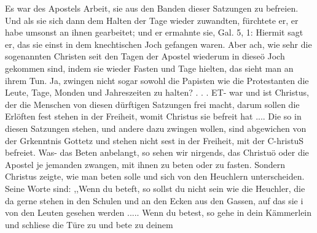 Es war des Apostels Arbeit, sie aus den Banden dieser
Satzungen zu befreien. Und als sie sich dann dem Halten der
Tage wieder zuwandten, fürchtete er, er habe umsonst an ihnen
gearbeitet; und er ermahnte sie, Gal. 5, 1: 
 Hiermit sagt
er, das sie einst in dem knechtischen Joch gefangen waren. Aber
ach, wie sehr die sogenannten Christen seit den Tagen der Apostel
wiederum in dieseö Joch gekommen sind, indem sie wieder Fasten
und Tage hielten, das sieht man an ihrem Tun. Ja, zwingen
nicht sogar sowohl die Papisten wie die Protestanten die Leute,
Tage, Monden und Jahreszeiten zu halten? . . . ET- war und
ist Christus, der die Menschen von diesen dürftigen Satzungen frei
macht, darum sollen die Erlöften fest stehen in der Freiheit, womit
Christus sie befreit hat .... Die so in diesen Satzungen stehen, und
andere dazu zwingen wollen, sind abgewichen von der Grkenntnis
Gottetz und stehen nicht sest in der Freiheit, mit der C-hristuS befreiet.
Was- das Beten anbelangt, so sehen wir nirgends, das Christuö
oder die Apostel je jemanden zwangen, mit ihnen zu beten oder
zu fasten. Sondern Christus zeigte, wie man beten solle und sich
von den Heuchlern unterscheiden. Seine Worte sind: ,,Wenn du
beteft, so sollst du nicht sein wie die Heuchler, die da gerne stehen
in den Schulen und an den Ecken aus den Gassen, auf das sie i
von den Leuten gesehen werden ..... Wenn du betest, so gehe
in dein Kämmerlein und schliese die Türe zu und bete zu deinem
